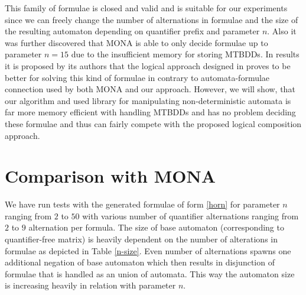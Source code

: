 This family of formulae is closed and valid and is suitable for our experiments
since we can freely change the number of alternations in formulae and the size
of the resulting automaton depending on quantifier prefix and parameter $n$.
Also it was further discovered that \textsc{MONA} is able to only decide
formulae up to parameter $n = 15$ due to the insufficient memory for storing
MTBDDs.
In results it is proposed by its authors that the logical approach designed in
\cite{logic-approach} proves to be better for solving this kind of formulae in
contrary to automata-formulae connection used by both \textsc{MONA} and our
approach. However, we will show, that our algorithm and used library for
manipulating non-deterministic automata \cite{vata-tool} is far more memory
efficient with handling MTBDDs and has no problem deciding these formulae and
thus can fairly compete with the proposed logical composition approach.

\section{Comparison with \textsc{MONA}}
We have run tests with the generated formulae of form \ref{horn} for parameter
$n$ ranging from $2$ to $50$ with various number of quantifier alternations
ranging from $2$ to $9$ alternation per formula. The size of base automaton
(corresponding to quantifier-free matrix) is heavily dependent on the number of
alterations in formulae as depicted in Table \ref{n-size}. Even number of
alternations spawns one additional negation of base automaton which then results
in disjunction of formulae that is handled as an union of automata. This way
the automaton size is increasing heavily in relation with parameter $n$.

